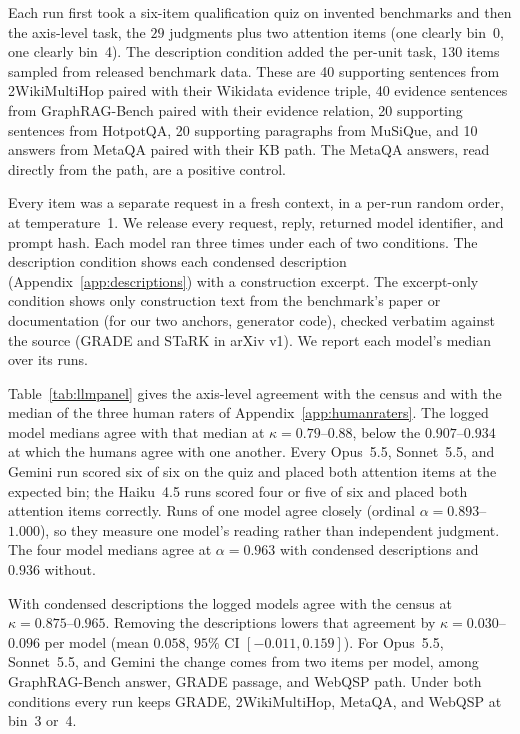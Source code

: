 \documentclass[11pt]{article}
\begin{document}
Each run first took a six-item qualification quiz on invented benchmarks and then the axis-level task, the $29$ judgments plus two attention items (one clearly bin~0, one clearly bin~4). The description condition added the per-unit task, $130$ items sampled from released benchmark data. These are 40 supporting sentences from 2WikiMultiHop paired with their Wikidata evidence triple, 40 evidence sentences from GraphRAG-Bench paired with their evidence relation, 20 supporting sentences from HotpotQA, 20 supporting paragraphs from MuSiQue, and 10 answers from MetaQA paired with their KB path. The MetaQA answers, read directly from the path, are a positive control.

Every item was a separate request in a fresh context, in a per-run random order, at temperature~1. We release every request, reply, returned model identifier, and prompt hash. Each model ran three times under each of two conditions. The description condition shows each condensed description (Appendix~\ref{app:descriptions}) with a construction excerpt. The excerpt-only condition shows only construction text from the benchmark's paper or documentation (for our two anchors, generator code), checked verbatim against the source (GRADE and STaRK in arXiv v1). We report each model's median over its runs.

Table~\ref{tab:llmpanel} gives the axis-level agreement with the census and with the median of the three human raters of Appendix~\ref{app:humanraters}. The logged model medians agree with that median at $\kappa=0.79$--$0.88$, below the $0.907$--$0.934$ at which the humans agree with one another. Every Opus~5.5, Sonnet~5.5, and Gemini run scored six of six on the quiz and placed both attention items at the expected bin; the Haiku~4.5 runs scored four or five of six and placed both attention items correctly. Runs of one model agree closely (ordinal $\alpha=0.893$--$1.000$), so they measure one model's reading rather than independent judgment. The four model medians agree at $\alpha=0.963$ with condensed descriptions and $0.936$ without.

With condensed descriptions the logged models agree with the census at $\kappa=0.875$--$0.965$. Removing the descriptions lowers that agreement by $\kappa=0.030$--$0.096$ per model (mean $0.058$, $95\%$ CI $[-0.011,0.159]$). For Opus~5.5, Sonnet~5.5, and Gemini the change comes from two items per model, among GraphRAG-Bench answer, GRADE passage, and WebQSP path. Under both conditions every run keeps GRADE, 2WikiMultiHop, MetaQA, and WebQSP at bin~3 or~4.
\end{document}
